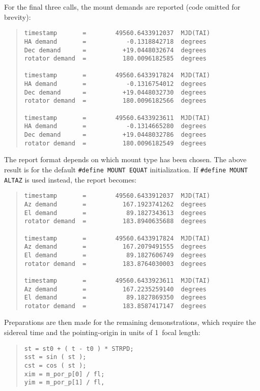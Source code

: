 \documentclass[12pt,fleqn,twoside]{article}
\renewcommand{\_}{{\tt\char'137}}     %
\begin{document}
For the final three calls, the mount demands are reported (code omitted
for brevity):
\begin{quote}
\begin{small}
\begin{verbatim}
timestamp       =        49560.6433912037  MJD(TAI)
HA demand       =           -0.1318842718  degrees
Dec demand      =          +19.0448032674  degrees
rotator demand  =          180.0096182585  degrees

timestamp       =        49560.6433917824  MJD(TAI)
HA demand       =           -0.1316754012  degrees
Dec demand      =          +19.0448032730  degrees
rotator demand  =          180.0096182566  degrees

timestamp       =        49560.6433923611  MJD(TAI)
HA demand       =           -0.1314665280  degrees
Dec demand      =          +19.0448032786  degrees
rotator demand  =          180.0096182549  degrees
\end{verbatim}\end{small}
\end{quote}
The report format depends on which mount type has been chosen.  The
above result is for the default {\tt \#define MOUNT EQUAT} initialization.
If {\tt \#define MOUNT ALTAZ} is used instead, the report becomes:
\begin{quote}
\begin{small}
\begin{verbatim}
timestamp       =        49560.6433912037  MJD(TAI)
Az demand       =          167.1923741262  degrees
El demand       =           89.1827343613  degrees
rotator demand  =          183.8940635688  degrees

timestamp       =        49560.6433917824  MJD(TAI)
Az demand       =          167.2079491555  degrees
El demand       =           89.1827606749  degrees
rotator demand  =          183.8764030003  degrees

timestamp       =        49560.6433923611  MJD(TAI)
Az demand       =          167.2235259140  degrees
El demand       =           89.1827869350  degrees
rotator demand  =          183.8587417147  degrees
\end{verbatim}\end{small}
\end{quote}
Preparations are then made for the remaining demonstrations, which require
the sidereal time and the pointing-origin in units of 1~focal length:
\begin{quote}
\begin{small}
\begin{verbatim}
st = st0 + ( t - t0 ) * STRPD;
sst = sin ( st );
cst = cos ( st );
xim = m_por_p[0] / fl;
yim = m_por_p[1] / fl,
\end{verbatim}\end{small}
\end{quote}
\end{document}
